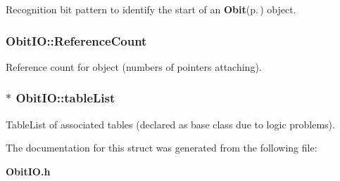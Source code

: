 Recognition bit pattern to identify the start of an {\bf Obit}{\rm (p.\,\pageref{structObit})} object. 

\subsubsection{ {\bf Obit\-IO::Reference\-Count}}\label{structObitIO_o2}


Reference count for object (numbers of pointers attaching). 

\subsubsection{$\ast$ {\bf Obit\-IO::table\-List}}\label{structObitIO_o9}


Table\-List of associated tables (declared as base class due to logic problems). 



The documentation for this struct was generated from the following file:\begin{CompactItemize}
\item 
{\bf Obit\-IO.h}\end{CompactItemize}
